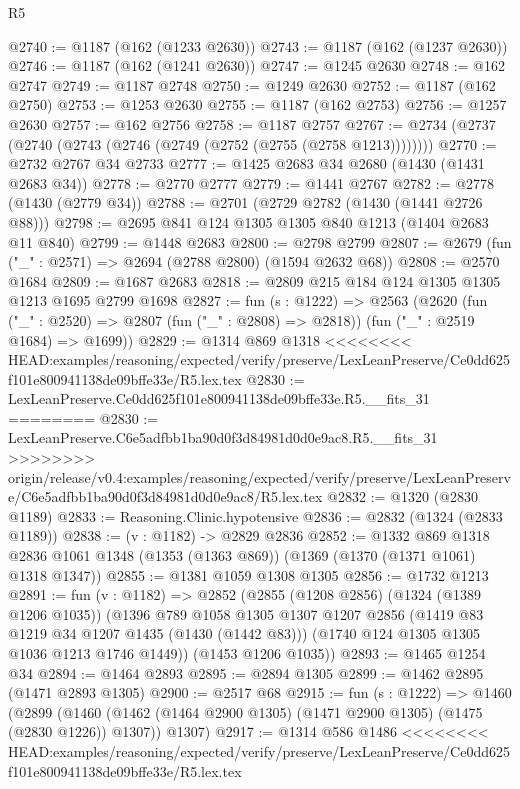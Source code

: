 \begin{lexlean}{R5}
\begin{coremodule}
{{{{{{{{{{{{{{{{{{{{{{{{{{{{{{{{{{{{{{{{{{{{{{{{{{{{{{{{{{{{{{{{{{{{{{{{{{{{{{{{{{{{@2740 := @1187 (@162 (@1233 @2630))
@2743 := @1187 (@162 (@1237 @2630))
@2746 := @1187 (@162 (@1241 @2630))
@2747 := @1245 @2630
@2748 := @162 @2747
@2749 := @1187 @2748
@2750 := @1249 @2630
@2752 := @1187 (@162 @2750)
@2753 := @1253 @2630
@2755 := @1187 (@162 @2753)
@2756 := @1257 @2630
@2757 := @162 @2756
@2758 := @1187 @2757
@2767 := @2734 (@2737 (@2740 (@2743 (@2746 (@2749 (@2752 (@2755 (@2758 @1213))))))))
@2770 := @2732 @2767 @34 @2733
@2777 := @1425 @2683 @34 @2680 (@1430 (@1431 @2683 @34))
@2778 := @2770 @2777
@2779 := @1441 @2767
@2782 := @2778 (@1430 (@2779 @34))
@2788 := @2701 (@2729 @2782 (@1430 (@1441 @2726 @88)))
@2798 := @2695 @841 @124 @1305 @1305 @840 @1213 (@1404 @2683 @11 @840)
@2799 := @1448 @2683
@2800 := @2798 @2799
@2807 := @2679 (fun ("_" : @2571) => @2694 (@2788 @2800) (@1594 @2632 @68))
@2808 := @2570 @1684
@2809 := @1687 @2683
@2818 := @2809 @215 @184 @124 @1305 @1305 @1213 @1695 @2799 @1698
@2827 := fun (s : @1222) =>
  @2563
    (@2620
      (fun ("_" : @2520) => @2807 (fun ("_" : @2808) => @2818))
      (fun ("_" : @2519 @1684) => @1699))
@2829 := @1314 @869 @1318
<<<<<<<< HEAD:examples/reasoning/expected/verify/preserve/LexLeanPreserve/Ce0dd625f101e800941138de09bffe33e/R5.lex.tex
@2830 := LexLeanPreserve.Ce0dd625f101e800941138de09bffe33e.R5.__fits_31
========
@2830 := LexLeanPreserve.C6e5adfbb1ba90d0f3d84981d0d0e9ac8.R5.__fits_31
>>>>>>>> origin/release/v0.4:examples/reasoning/expected/verify/preserve/LexLeanPreserve/C6e5adfbb1ba90d0f3d84981d0d0e9ac8/R5.lex.tex
@2832 := @1320 (@2830 @1189)
@2833 := Reasoning.Clinic.hypotensive
@2836 := @2832 (@1324 (@2833 @1189))
@2838 := (v : @1182) -> @2829 @2836
@2852 := @1332
    @869
    @1318
    @2836
    @1061
    @1348
    (@1353 (@1363 @869))
    (@1369 (@1370 (@1371 @1061) @1318 @1347))
@2855 := @1381 @1059 @1308 @1305
@2856 := @1732 @1213
@2891 := fun (v : @1182) =>
  @2852
    (@2855
      (@1208 @2856)
      (@1324 (@1389 @1206 @1035))
      (@1396
        @789
        @1058
        @1305
        @1307
        @1207
        @2856
        (@1419 @83 @1219 @34 @1207 @1435 (@1430 (@1442 @83)))
        (@1740 @124 @1305 @1305 @1036 @1213 @1746 @1449))
      (@1453 @1206 @1035))
@2893 := @1465 @1254 @34
@2894 := @1464 @2893
@2895 := @2894 @1305
@2899 := @1462 @2895 (@1471 @2893 @1305)
@2900 := @2517 @68
@2915 := fun (s : @1222) =>
  @1460
    (@2899
      (@1460 (@1462 (@1464 @2900 @1305) (@1471 @2900 @1305) (@1475 (@2830 @1226)) @1307))
      @1307)
@2917 := @1314 @586 @1486
<<<<<<<< HEAD:examples/reasoning/expected/verify/preserve/LexLeanPreserve/Ce0dd625f101e800941138de09bffe33e/R5.lex.tex
}}}}}}}}}}}}}}}}}}}}}}}}}}}}}}}}}}}}}}}}}}}}}}}}}}}}}}}}}}}}}}}}}}}}}}}}}}}}}}}}}}}}
\end{coremodule}
\end{lexlean}
